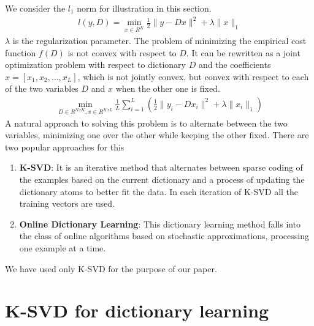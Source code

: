 \documentclass{article} %
\begin{document}
We consider the $l_1$ norm for illustration in this section.
\begin{align}
l(y, D) = \min_{x \in R^K} \frac{1}{2}\|y - Dx\|^2 + \lambda \|x\|_1
\end{align}
$\lambda$ is the regularization parameter. The problem of minimizing the empirical cost function $f(D)$ is not convex with respect to $D$. It can be rewritten as a joint optimization problem with respect to dictionary $D$ and the coefficients $x = [x_1, x_2, \ldots, x_L]$, which is not jointly convex, but convex with respect to each of the two variables $D$ and $x$ when the other one is fixed.
\begin{align}
\min_{D\in R^{NxK}, x\in R^{KxL}} \frac{1}{L}\sum_{i=1}^{L} \left( \frac{1}{2}\|y_i - Dx_i\|^2 + \lambda \|x_i\|_1 \right)
\end{align} 
A natural approach to solving this problem is to alternate between the two variables, minimizing one over the other while keeping the other fixed. There are two popular approaches for this
\begin{enumerate}
\item \textbf{K-SVD}: It is an iterative method that alternates between sparse coding of the examples based on the current dictionary and a process of updating the dictionary atoms to better fit the data. In each iteration of K-SVD all the training vectors are used. \cite{aharon2006svd, rubinstein2008efficient}
\item \textbf{Online Dictionary Learning}: This dictionary learning method falls into the class of online algorithms based on stochastic approximations, processing one example at a time. \cite{mairal2009online}
\end{enumerate} 

We have used only K-SVD for the purpose of our paper.
 

\section{K-SVD for dictionary learning}
\end{document}
